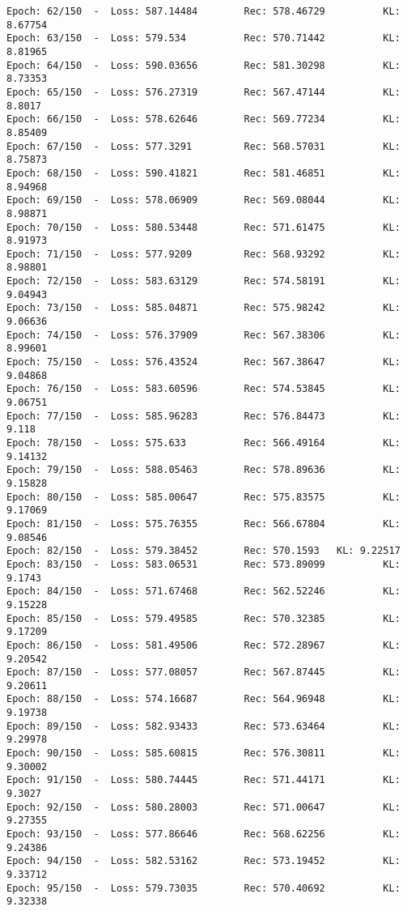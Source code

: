 \documentclass[11pt]{article}
\begin{document}
\begin{Verbatim}[commandchars=\\\{\}]
Epoch: 62/150  -  Loss: 587.14484        Rec: 578.46729          KL: 8.67754
Epoch: 63/150  -  Loss: 579.534          Rec: 570.71442          KL: 8.81965
Epoch: 64/150  -  Loss: 590.03656        Rec: 581.30298          KL: 8.73353
Epoch: 65/150  -  Loss: 576.27319        Rec: 567.47144          KL: 8.8017
Epoch: 66/150  -  Loss: 578.62646        Rec: 569.77234          KL: 8.85409
Epoch: 67/150  -  Loss: 577.3291         Rec: 568.57031          KL: 8.75873
Epoch: 68/150  -  Loss: 590.41821        Rec: 581.46851          KL: 8.94968
Epoch: 69/150  -  Loss: 578.06909        Rec: 569.08044          KL: 8.98871
Epoch: 70/150  -  Loss: 580.53448        Rec: 571.61475          KL: 8.91973
Epoch: 71/150  -  Loss: 577.9209         Rec: 568.93292          KL: 8.98801
Epoch: 72/150  -  Loss: 583.63129        Rec: 574.58191          KL: 9.04943
Epoch: 73/150  -  Loss: 585.04871        Rec: 575.98242          KL: 9.06636
Epoch: 74/150  -  Loss: 576.37909        Rec: 567.38306          KL: 8.99601
Epoch: 75/150  -  Loss: 576.43524        Rec: 567.38647          KL: 9.04868
Epoch: 76/150  -  Loss: 583.60596        Rec: 574.53845          KL: 9.06751
Epoch: 77/150  -  Loss: 585.96283        Rec: 576.84473          KL: 9.118
Epoch: 78/150  -  Loss: 575.633          Rec: 566.49164          KL: 9.14132
Epoch: 79/150  -  Loss: 588.05463        Rec: 578.89636          KL: 9.15828
Epoch: 80/150  -  Loss: 585.00647        Rec: 575.83575          KL: 9.17069
Epoch: 81/150  -  Loss: 575.76355        Rec: 566.67804          KL: 9.08546
Epoch: 82/150  -  Loss: 579.38452        Rec: 570.1593   KL: 9.22517
Epoch: 83/150  -  Loss: 583.06531        Rec: 573.89099          KL: 9.1743
Epoch: 84/150  -  Loss: 571.67468        Rec: 562.52246          KL: 9.15228
Epoch: 85/150  -  Loss: 579.49585        Rec: 570.32385          KL: 9.17209
Epoch: 86/150  -  Loss: 581.49506        Rec: 572.28967          KL: 9.20542
Epoch: 87/150  -  Loss: 577.08057        Rec: 567.87445          KL: 9.20611
Epoch: 88/150  -  Loss: 574.16687        Rec: 564.96948          KL: 9.19738
Epoch: 89/150  -  Loss: 582.93433        Rec: 573.63464          KL: 9.29978
Epoch: 90/150  -  Loss: 585.60815        Rec: 576.30811          KL: 9.30002
Epoch: 91/150  -  Loss: 580.74445        Rec: 571.44171          KL: 9.3027
Epoch: 92/150  -  Loss: 580.28003        Rec: 571.00647          KL: 9.27355
Epoch: 93/150  -  Loss: 577.86646        Rec: 568.62256          KL: 9.24386
Epoch: 94/150  -  Loss: 582.53162        Rec: 573.19452          KL: 9.33712
Epoch: 95/150  -  Loss: 579.73035        Rec: 570.40692          KL: 9.32338

\end{Verbatim}
\end{document}
